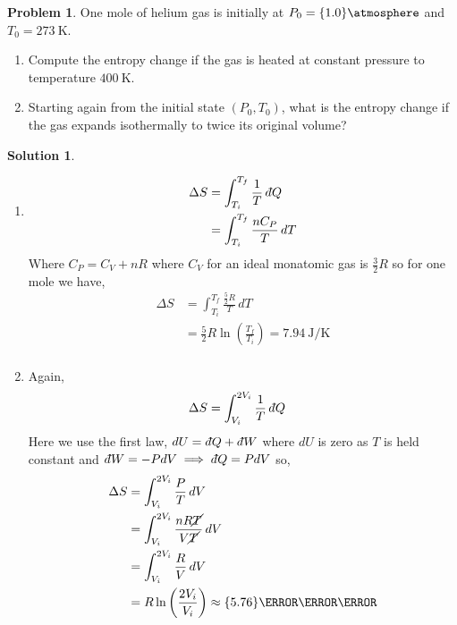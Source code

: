\documentclass[10pt]{article}
\theoremstyle{definition}
\newtheorem{problem}{Problem}
\newtheorem{soln}{Solution}
\newcommand{\dbar}{d\hspace*{-0.08em}\bar{}\hspace*{0.1em}}
\begin{document}
\begin{problem}
One mole of helium gas is initially at $P_0=\qty{1.0}{\atmosphere}$ and $T_0=\qty{273}{\kelvin}$.
\begin{enumerate}[label=(\alph*)]
  \item Compute the entropy change if the gas is heated at constant pressure to temperature $\qty{400}{\kelvin}$.
  \item Starting again from the initial state $(P_0, T_0)$, what is the entropy change if
        the gas expands isothermally to twice its original volume?
\end{enumerate}
\end{problem}
\begin{soln}~
  \begin{enumerate}[label=(\alph*)]
    \item \begin{align*}
            \Delta S & = \int_{T_i}^{T_f}\frac{1}{T}\,\dbar Q \\
                     & = \int_{T_i}^{T_f}\frac{nC_P}{T}\,dT
          \end{align*}
          Where $C_P=C_V+nR$ where $C_V$ for an ideal monatomic gas is $\frac{3}{2}R$ so for one mole we have,
          \begin{align*}
            \Delta S & = \int_{T_i}^{T_f}\frac{\frac{5}{2}R}{T}\,dT                                \\
                     & = \frac{5}{2}R\ln\left(\frac{T_f}{T_i}\right)=\qty{7.94}{\joule\per\kelvin} \\
          \end{align*}
    \item Again,
          \begin{align*}
            \Delta S & = \int_{V_i}^{2V_i}\frac{1}{T}\,\dbar Q
          \end{align*}
          Here we use the first law, $dU=\dbar Q+\dbar W$ where $dU$ is zero as $T$ is held constant and $\dbar W=-PdV\implies \dbar Q=PdV$ so,
          \begin{align*}
            \Delta S & = \int_{V_i}^{2V_i}\frac{P}{T}\,dV                                      \\
                     & = \int_{V_i}^{2V_i}\frac{nR\cancel{T}}{V\cancel{T}}\,dV                 \\
                     & = \int_{V_i}^{2V_i}\frac{R}{V}\,dV                                      \\
                     & = R\ln\left(\frac{2V_i}{V_i}\right)\approx\qty{5.76}{\joule\per\kelvin} \\
          \end{align*}
  \end{enumerate}
\end{soln}
\end{document}
